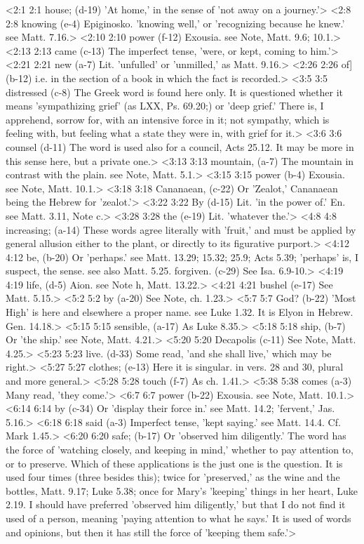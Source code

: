 <2:1 2:1  house; (d-19)  'At home,' in the sense of 'not away on a journey.'>
<2:8 2:8  knowing (e-4)  Epiginosko. 'knowing well,' or 'recognizing because he  knew.' see Matt. 7.16.>
<2:10 2:10  power (f-12)  Exousia. see Note, Matt. 9.6; 10.1.>
<2:13 2:13  came (c-13)  The imperfect tense, 'were, or kept, coming to him.'>
<2:21 2:21  new (a-7)  Lit. 'unfulled' or 'unmilled,' as Matt. 9.16.>
<2:26 2:26  of] (b-12)  i.e. in the section of a book in which the fact is recorded.>
<3:5 3:5  distressed (c-8)  The Greek word is found here only. It is questioned whether  it means 'sympathizing grief' (as LXX, Ps. 69.20;) or 'deep  grief.' There is, I apprehend, sorrow for, with an intensive  force in it; not sympathy, which is feeling with, but feeling  what a state they were in, with grief for it.>
<3:6 3:6  counsel (d-11)  The word is used also for a council, Acts 25.12. It may be  more in this sense here, but a private one.>
<3:13 3:13  mountain, (a-7)  The mountain in contrast with the plain. see Note, Matt. 5.1.>
<3:15 3:15  power (b-4)  Exousia. see Note, Matt. 10.1.>
<3:18 3:18  Cananaean, (c-22)  Or 'Zealot,' Cananaean being the Hebrew for 'zealot.'>
<3:22 3:22  By (d-15)  Lit. 'in the power of.' En. see Matt. 3.11, Note c.>
<3:28 3:28  the (e-19)  Lit. 'whatever the.'>
<4:8 4:8  increasing; (a-14)  These words agree literally with 'fruit,' and must be applied  by general allusion either to the plant, or directly to its  figurative purport.>
<4:12 4:12  be, (b-20)  Or 'perhaps.' see Matt. 13.29; 15.32; 25.9; Acts 5.39;  'perhaps' is, I suspect, the sense. see also Matt. 5.25.
  forgiven. (c-29)  See Isa. 6.9-10.>
<4:19 4:19  life, (d-5)  Aion. see Note h, Matt. 13.22.>
<4:21 4:21  bushel (e-17)  See Matt. 5.15.>
<5:2 5:2  by (a-20)  See Note, ch. 1.23.>
<5:7 5:7  God? (b-22)  'Most High' is here and elsewhere a proper name. see Luke  1.32. It is Elyon in Hebrew. Gen. 14.18.>
<5:15 5:15  sensible, (a-17)  As Luke 8.35.>
<5:18 5:18  ship, (b-7)  Or 'the ship.' see Note, Matt. 4.21.>
<5:20 5:20  Decapolis (c-11)  See Note, Matt. 4.25.>
<5:23 5:23  live. (d-33)  Some read, 'and she shall live,' which may be right.>
<5:27 5:27  clothes; (e-13)  Here it is singular. in vers. 28 and 30, plural and more  general.>
<5:28 5:28  touch (f-7)  As ch. 1.41.>
<5:38 5:38  comes (a-3)  Many read, 'they come.'>
<6:7 6:7  power (b-22)  Exousia. see Note, Matt. 10.1.>
<6:14 6:14  by (c-34)  Or 'display their force in.' see Matt. 14.2; 'fervent,' Jas.  5.16.>
<6:18 6:18  said (a-3)  Imperfect tense, 'kept saying.' see Matt. 14.4. Cf. Mark  1.45.>
<6:20 6:20  safe; (b-17)  Or 'observed him diligently.' The word has the force of  'watching closely, and keeping in mind,' whether to pay  attention to, or to preserve. Which of these applications is  the just one is the question. It is used four times (three  besides this); twice for 'preserved,' as the wine and the  bottles, Matt. 9.17; Luke 5.38; once for Mary's 'keeping'  things in her heart, Luke 2.19. I should have preferred  'observed him diligently,' but that I do not find it used of a person,  meaning 'paying attention to what he says.' It is used  of words and opinions, but then it has still the force of  'keeping them safe.'>
